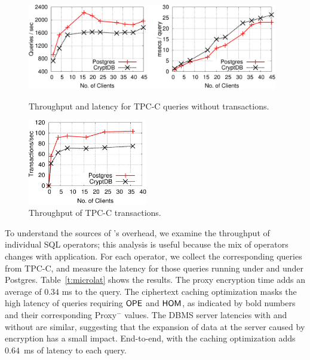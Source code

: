 \begin{figure}[t!]
\begin{minipage}[t]{4.3in}
\centering
\includegraphics[width=4.3in]{fig/queries.pdf}
\vspace{-0.7cm}
\caption{Throughput and latency for TPC-C queries without transactions.}
\label{fig:querytputlat}
\end{minipage}
\hspace{0.3cm}
\begin{minipage}[t]{2.1in}
\centering
\includegraphics[width=2.05in]{fig/trantput.pdf}
\vspace{-0.3cm}
\caption{Throughput of TPC-C transactions.}
\label{fig:trantput}
\end{minipage}
\end{figure}


To understand the sources of \name's overhead, we examine the
throughput of individual SQL operators; this analysis is useful
because the mix of operators changes with application.  For each
operator, we collect the corresponding queries from TPC-C, and
measure the latency for those queries running under \name and under
Postgres.  Table~\ref{t:microlat} shows the results.
The proxy encryption time adds an average of $0.34$ ms to the query.
The ciphertext caching optimization masks the high latency of queries
requiring $\mathsf{OPE}$ and $\mathsf{HOM}$, as indicated by bold numbers and their
corresponding Proxy$^-$ values.
The DBMS server latencies with and without \name are similar,
suggesting that the expansion of data at the server caused by encryption has a small
impact.
End-to-end, \name with the caching optimization adds
$0.64$~ms of latency to each query.

